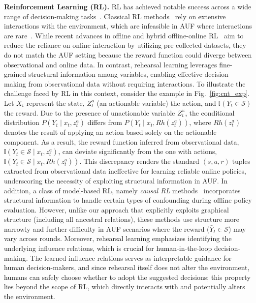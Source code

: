 \documentclass{article}
\theoremstyle{plain}
\theoremstyle{definition}
\theoremstyle{remark}
\def \Fig {Fig.}
\def \sS {\mathcal{S}}
\begin{document}
\noindent\textbf{Reinforcement Learning (RL).} RL has achieved notable success across a wide range of decision-making tasks~\citep{sutton2018reinforcement}. Classical RL methods~\citep{Lillicrap2016ddpg, John2017PPO, haarnoja2018SAC} rely on extensive interactions with the environment, which are infeasible in AUF where interactions are rare~\citep{zhouzh2022rehearsal,qint2023srm}. 
While recent advances in offline and hybrid offline-online RL~\citep{song2022hybrid, pong2022offline, pmlr-v202-li23av, NEURIPS2023_c1aaf7c3} aim to reduce the reliance on online interaction by utilizing pre-collected datasets, they do not match the AUF setting because the reward function could diverge between observational and online data. 
In contrast, rehearsal learning leverages fine-grained structural information among variables, enabling effective decision-making from observational data without requiring interactions. 
To illustrate the challenge faced by RL in this context, consider the example in \Fig~\ref{fig:cnt_exp}. Let \(X_t\) represent the state, \(Z_t^a\) (an actionable variable) the action, and \(\mathbb{I}(Y_t \in \sS)\) the reward. 
Due to the presence of unactionable variable \(Z_t^u\), the conditional distribution \(P(Y_t \mid x_t, z_t^a)\) differs from  \(P(Y_t \mid x_t, Rh(z_t^a))\), where \(Rh(z_t^a)\) denotes the result of applying an action based solely on the actionable component. 
As a result, the reward function inferred from observational data, \(\mathbb{I}(Y_t \in \sS \mid x_t, z_t^a)\), can deviate significantly from the one with actions, \(\mathbb{I}(Y_t \in \sS \mid x_t, Rh(z_t^a))\). This discrepancy renders the standard \((s, a, r)\) tuples extracted from observational data ineffective for learning reliable online policies, underscoring the necessity of exploiting structural information in AUF. 
In addition, a class of model-based RL, namely \emph{causal RL} methods~\citep{kallus2020confounding, bruns2021model, kausik2024offline} incorporates structural information to handle certain types of confounding during offline policy evaluation. 
However, unlike our approach that explicitly exploits graphical structure (including all ancestral relations), these methods use structure more narrowly and further difficulty in AUF scenarios where the reward (\(\bar{Y}_t \in \sS\)) may vary across rounds.
Moreover, rehearsal learning emphasizes identifying the underlying influence relations, which is crucial for human-in-the-loop decision-making. 
The learned influence relations serves as interpretable guidance for human decision-makers, and since rehearsal itself does not alter the environment, humans can safely choose whether to adopt the suggested decisions; this property lies beyond the scope of RL, which directly interacts with and potentially alters the environment.
\end{document}
